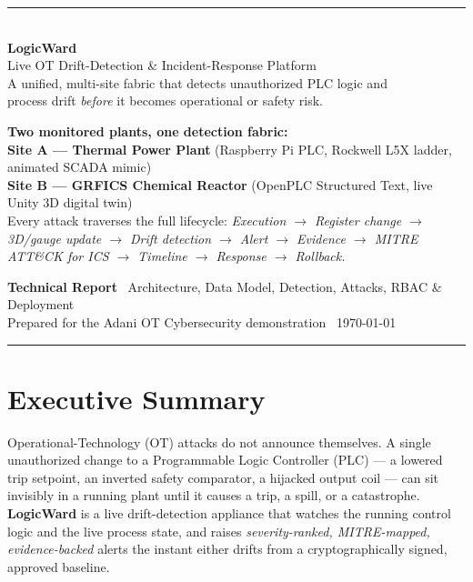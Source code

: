 \documentclass[11pt,a4paper]{article}
\begin{document}
\begin{titlepage}
\thispagestyle{empty}
\vspace*{1.1cm}
{\color{navy}\rule{\textwidth}{2.5pt}}\\[0.5cm]
{\Huge\bfseries\color{navy} LogicWard}\\[0.30cm]
{\LARGE\color{navy2} Live OT Drift-Detection \& Incident-Response Platform}\\[0.20cm]
{\large\color{muted} A unified, multi-site fabric that detects unauthorized PLC logic and\\
process drift \emph{before} it becomes operational or safety risk.}\\[1.0cm]

\begin{tcolorbox}[colback=accent!6,colframe=accent,boxrule=1pt,arc=3pt,left=12pt,right=12pt,top=10pt,bottom=10pt]
\color{ink}\small
\textbf{Two monitored plants, one detection fabric:}\\[3pt]
\textbf{Site A — Thermal Power Plant} (Raspberry Pi PLC, Rockwell L5X ladder, animated SCADA mimic)\\
\textbf{Site B — GRFICS Chemical Reactor} (OpenPLC Structured Text, live Unity 3D digital twin)\\[5pt]
Every attack traverses the full lifecycle: \emph{Execution $\rightarrow$ Register change $\rightarrow$ 3D/gauge update $\rightarrow$
Drift detection $\rightarrow$ Alert $\rightarrow$ Evidence $\rightarrow$ MITRE ATT\&CK for ICS $\rightarrow$ Timeline $\rightarrow$ Response $\rightarrow$ Rollback.}
\end{tcolorbox}

\vfill
{\color{muted}\small
\textbf{Technical Report} \textbullet\ Architecture, Data Model, Detection, Attacks, RBAC \& Deployment\\
Prepared for the Adani OT Cybersecurity demonstration \textbullet\ \today}\\[0.3cm]
{\color{navy}\rule{\textwidth}{2.5pt}}
\end{titlepage}

\tableofcontents
\newpage

\section{Executive Summary}
Operational-Technology (OT) attacks do not announce themselves. A single unauthorized
change to a Programmable Logic Controller (PLC) --- a lowered trip setpoint, an inverted
safety comparator, a hijacked output coil --- can sit invisibly in a running plant until it
causes a trip, a spill, or a catastrophe. \textbf{LogicWard} is a live drift-detection
appliance that watches the running control logic and the live process state, and raises
\emph{severity-ranked, MITRE-mapped, evidence-backed} alerts the instant either drifts from a
cryptographically signed, approved baseline.
\end{document}
